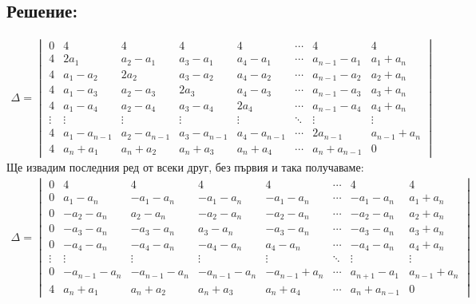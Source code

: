 \documentclass[a4paper, 12pt, oneside]{article}
\begin{document}
\subsection*{Решение:}
\begin{align*}
\Delta = \begin{vmatrix}
    0 & 4 & 4 & 4 & 4 & \cdots & 4  & 4 \\
    4 & 2a_1 & a_2 - a_1 & a_3 - a_1 & a_4 - a_1 & \cdots & a_{n - 1} - a_1 & a_1 + a_n \\
    4 & a_1 - a_2 & 2a_2 & a_3 - a_2 & a_4 - a_2 & \cdots & a_{n - 1} - a_2 & a_2 + a_n \\
    4 & a_1 - a_3 & a_2 - a_3 & 2a_3 & a_4 - a_3 & \cdots & a_{n - 1} - a_3 & a_3 + a_n \\
    4 & a_1 - a_4 & a_2 - a_4 & a_3 - a_4 & 2a_4 & \cdots & a_{n - 1} - a_4 & a_4 + a_n \\
    \vdots & \vdots & \vdots & \vdots & \vdots & \ddots & \vdots & \vdots \\
    4 & a_1 - a_{n - 1} & a_2 - a_{n - 1} & a_3 - a_{n - 1} & a_4 - a_{n - 1} & \cdots & 2a_{n - 1} & a_{n - 1} + a_n \\
    4 & a_n + a_1 & a_n + a_2 & a_n + a_3 & a_n + a_4 & \cdots & a_n + a_{n - 1} & 0
\end{vmatrix}
\end{align*}
Ще извадим последния ред от всеки друг, без първия и така получаваме:
\begin{align*}
\Delta = \begin{vmatrix}
    0 & 4 & 4 & 4 & 4 & \cdots & 4  & 4 \\
    0 & a_1 - a_n & -a_1 - a_n & -a_1 - a_n & -a_1 - a_n & \cdots & -a_1 - a_n & a_1 + a_n \\
    0 & -a_2 - a_n & a_2 - a_n & -a_2 - a_n & -a_2 - a_n & \cdots & -a_2 - a_n & a_2 + a_n \\
    0 & -a_3 - a_n & -a_3 - a_n & a_3 - a_n & -a_3 - a_n & \cdots & -a_3 - a_n & a_3 + a_n \\
    0 & -a_4 - a_n & -a_4 - a_n & -a_4 - a_n & a_4 - a_n & \cdots & -a_4 - a_n & a_4 + a_n \\
    \vdots & \vdots & \vdots & \vdots & \vdots & \ddots & \vdots & \vdots \\
    0 & -a_{n - 1} - a_n & -a_{n - 1} - a_n & -a_{n - 1} - a_n & -a_{n - 1} + a_n & \cdots & a_{n + 1} - a_1 & a_{n - 1} + a_n \\
    4 & a_n + a_1 & a_n + a_2 & a_n + a_3 & a_n + a_4 & \cdots & a_n + a_{n - 1} & 0
\end{vmatrix}
\end{align*}
\end{document}
